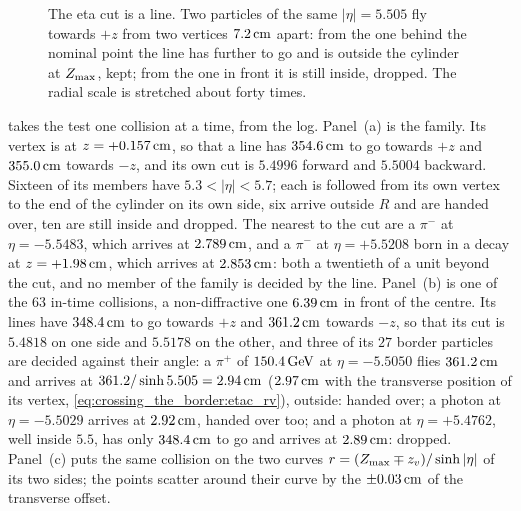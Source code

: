 \begin{figure}[htbp]\centering
\resizebox{0.92\textwidth}{!}{}
\caption[The eta cut is a line]{The eta cut is a line. Two particles of the
same $|\eta|=5.505$ fly towards $+z$ from two vertices $7.2\,\mathrm{cm}$ apart: from
the one behind the nominal point the line has further to go and is outside
the cylinder at $Z_{\max}$, kept; from the one in front it is still inside,
dropped. The radial scale is stretched about forty times.}
\label{fig:crossing_the_border:line}
\end{figure}

 takes the test one collision at
a time, from the  log. Panel~(a) is the family. Its vertex is at
$z=+0.157\,\mathrm{cm}$, so that a line has $354.6\,\mathrm{cm}$ to go towards $+z$ and
$355.0\,\mathrm{cm}$ towards $-z$, and its own cut is $5.4996$ forward and $5.5004$
backward. Sixteen of its members have $5.3<|\eta|<5.7$; each is followed
from its own vertex to the end of the cylinder on its own side, six arrive
outside $R$ and are handed over, ten are still inside and dropped. The
nearest to the cut are a $\pi^-$ at $\eta=-5.5483$, which arrives at
$2.789\,\mathrm{cm}$, and a $\pi^-$ at $\eta=+5.5208$ born in a decay at $z=+1.98\,\mathrm{cm}$,
which arrives at $2.853\,\mathrm{cm}$: both a twentieth of a unit beyond the cut, and
no member of the family is decided by the line. Panel~(b) is one of the
$63$ in-time collisions, a non-diffractive one $6.39\,\mathrm{cm}$ in front of the
centre. Its lines have $348.4\,\mathrm{cm}$ to go towards $+z$ and $361.2\,\mathrm{cm}$ towards
$-z$, so that its cut is $5.4818$ on one side and $5.5178$ on the other, and
three of its $27$ border particles are decided against their angle: a
$\pi^+$ of $150.4\,\mathrm{GeV}$ at $\eta=-5.5050$ flies $361.2\,\mathrm{cm}$ and arrives at
$361.2/\sinh5.505=2.94\,\mathrm{cm}$ ($2.97\,\mathrm{cm}$ with the transverse position of its
vertex, \cref{eq:crossing_the_border:etac_rv}), outside: handed over; a
photon at $\eta=-5.5029$ arrives at $2.92\,\mathrm{cm}$, handed over too; and a photon
at $\eta=+5.4762$, well inside $5.5$, has only $348.4\,\mathrm{cm}$ to go and arrives
at $2.89\,\mathrm{cm}$: dropped. Panel~(c) puts the same collision on the two curves
$r=(Z_{\max}\mp z_v)/\sinh|\eta|$ of its two sides; the points scatter around
their curve by the $\pm0.03\,\mathrm{cm}$ of the transverse offset.

